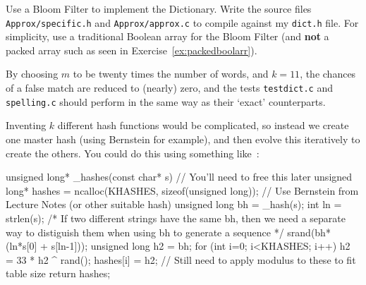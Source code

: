 \begin{exercise}

Use a Bloom Filter to implement the Dictionary. Write the source files
\verb^Approx/specific.h^ and \verb^Approx/approx.c^ to compile against
my \verb^dict.h^ file. For simplicity, use a traditional Boolean array
for the Bloom Filter (and {\bf not} a packed array such as seen in
Exercise~\ref{ex:packedboolarr}).

By choosing $m$ to be twenty times the number of words, and $k=11$, the chances
of a false match are reduced to (nearly) zero, and the tests \verb^testdict.c^ and
\verb^spelling.c^ should perform in the same way as their `exact' counterparts.

Inventing $k$ different hash functions would be complicated, 
so instead we create one master hash (using Bernstein for
example), and then evolve this iteratively to create the others. You could do
this using something like~:
\begin{codesnippet}
unsigned long* _hashes(const char* s)
{
   // You'll need to free this later
   unsigned long* hashes = ncalloc(KHASHES, sizeof(unsigned long));
   // Use Bernstein from Lecture Notes (or other suitable hash)
   unsigned long bh = _hash(s);
   int ln = strlen(s);
   /* If two different strings have the same bh, then
      we need a separate way to distiguish them when using
      bh to generate a sequence */
   srand(bh*(ln*s[0] + s[ln-1]));
   unsigned long h2 = bh;
   for (int i=0; i<KHASHES; i++) {
      h2 = 33 * h2 ^ rand();
      hashes[i] = h2;
   }
   // Still need to apply modulus to these to fit table size
   return hashes;
}
\end{codesnippet}


\end{exercise}

